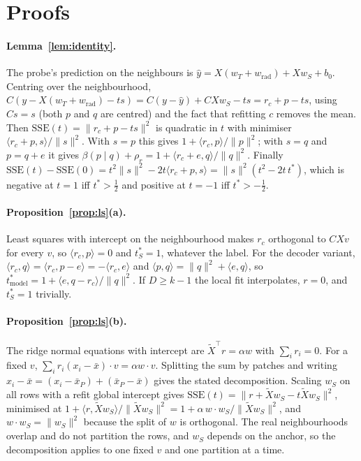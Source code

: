 \documentclass[10pt]{article}
\newcommand{\norm}[1]{\lVert #1 \rVert}
\newcommand{\tmodel}{t^*_{\mathrm{model}}}
\begin{document}



\appendix

\section{Proofs}
\label{app:proofs}

\paragraph{Lemma~\ref{lem:identity}.} The probe's prediction on the neighbours is $\hat y=X(w_T+w_{\mathrm{rad}})+Xw_S+b_0$. Centring over the neighbourhood, $C(y-X(w_T+w_{\mathrm{rad}})-ts)=C(y-\hat y)+CXw_S-ts=r_c+p-ts$, using $Cs=s$ (both $p$ and $q$ are centred) and the fact that refitting $c$ removes the mean. Then $\mathrm{SSE}(t)=\norm{r_c+p-ts}^2$ is quadratic in $t$ with minimiser $\langle r_c+p,s\rangle/\norm{s}^2$. With $s=p$ this gives $1+\langle r_c,p\rangle/\norm{p}^2$; with $s=q$ and $p=q+e$ it gives $\beta(p\mid q)+\rho_r=1+\langle r_c+e,q\rangle/\norm{q}^2$. Finally $\mathrm{SSE}(t)-\mathrm{SSE}(0)=t^2\norm{s}^2-2t\langle r_c+p,s\rangle=\norm{s}^2(t^2-2t\,t^*)$, which is negative at $t=1$ iff $t^*>\tfrac12$ and positive at $t=-1$ iff $t^*>-\tfrac12$.

\paragraph{Proposition~\ref{prop:ls}(a).} Least squares with intercept on the neighbourhood makes $r_c$ orthogonal to $CXv$ for every $v$, so $\langle r_c,p\rangle=0$ and $t^*_S=1$, whatever the label. For the decoder variant, $\langle r_c,q\rangle=\langle r_c,p-e\rangle=-\langle r_c,e\rangle$ and $\langle p,q\rangle=\norm{q}^2+\langle e,q\rangle$, so $\tmodel=1+\langle e,q-r_c\rangle/\norm{q}^2$. If $D\ge k-1$ the local fit interpolates, $r=0$, and $t^*_S=1$ trivially.

\paragraph{Proposition~\ref{prop:ls}(b).} The ridge normal equations with intercept are $\tilde X^\top r=\alpha w$ with $\sum_ir_i=0$. For a fixed $v$, $\sum_ir_i(x_i-\bar x)\cdot v=\alpha w\cdot v$. Splitting the sum by patches and writing $x_i-\bar x=(x_i-\bar x_P)+(\bar x_P-\bar x)$ gives the stated decomposition. Scaling $w_S$ on all rows with a refit global intercept gives $\mathrm{SSE}(t)=\norm{r+\tilde Xw_S-t\tilde Xw_S}^2$, minimised at $1+\langle r,\tilde Xw_S\rangle/\norm{\tilde Xw_S}^2=1+\alpha\,w\cdot w_S/\norm{\tilde Xw_S}^2$, and $w\cdot w_S=\norm{w_S}^2$ because the split of $w$ is orthogonal. The real neighbourhoods overlap and do not partition the rows, and $w_S$ depends on the anchor, so the decomposition applies to one fixed $v$ and one partition at a time.
\end{document}
